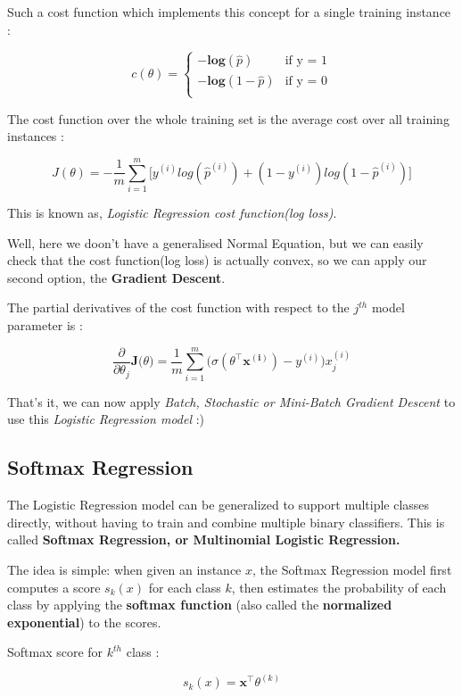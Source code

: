 \documentclass[11pt, a4paper]{book}
\begin{document}
Such a cost function which implements this concept for a single training
instance :

\[c(\theta) = \begin{cases} \mathbf{-log}(\hat{p}) & \text{if y = 1}\\ \mathbf{-log}(1-\hat{p}) & \text{if y = 0}\\ \end{cases}\]

The cost function over the whole training set is the average cost over
all training instances :

\[J(\theta) = -\frac{1}{m}\sum_{i=1}^{m} \Big[ y^{(i)}log(\hat{p}^{(i)}) + (1 - y^{(i)})log(1-\hat{p}^{(i)})\Big]\]

This is known as, \emph{Logistic Regression cost function(log loss)}.

Well, here we doon't have a generalised Normal Equation, but we can
easily check that the cost function(log loss) is actually convex, so we
can apply our second option, the \textbf{Gradient Descent}.

The partial derivatives of the cost function with respect to the
\(j^{th}\) model parameter is :

\[\frac{\partial}{\partial \theta_{j}}\mathbf{J(}\theta) = \frac{1}{m} \sum_{i=1}^{m}\Big(\sigma(\theta^{\intercal}\mathbf{x^{(i)}}) - y^{(i)}\Big)x_{j}^{(i)}\]

That's it, we can now apply \emph{Batch, Stochastic or Mini-Batch
Gradient Descent} to use this \emph{Logistic Regression model} :)

    \hypertarget{softmax-regression}{%
\subsection{Softmax Regression}\label{softmax-regression}}

The Logistic Regression model can be generalized to support multiple
classes directly, without having to train and combine multiple binary
classifiers. This is called \textbf{Softmax Regression, or Multinomial
Logistic Regression.}

The idea is simple: when given an instance \(x\), the Softmax Regression
model first computes a score \(s_{k}(x)\) for each class \(k\), then
estimates the probability of each class by applying the \textbf{softmax
function} (also called the \textbf{normalized exponential}) to the
scores.

Softmax score for \(k^{th}\) class :

\[ s_{k}(x) = \mathbf{x^\intercal}\theta^{(k)} \]
\end{document}
